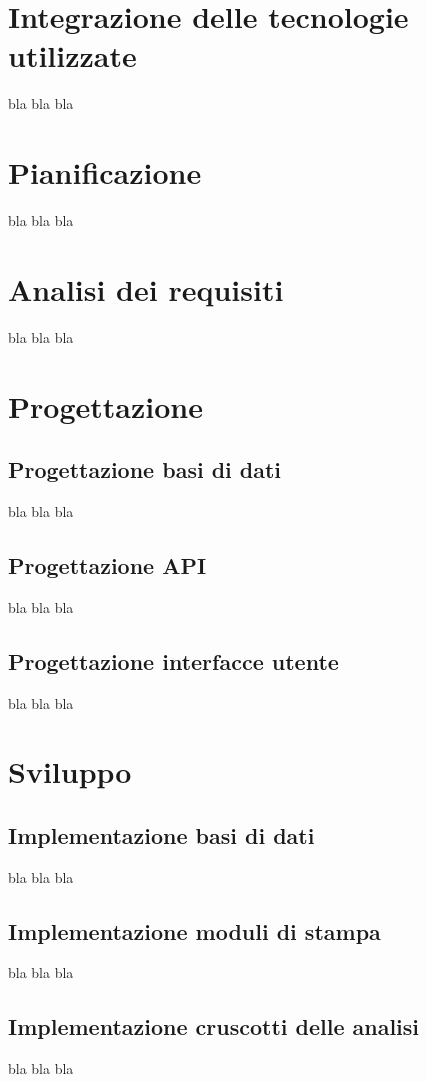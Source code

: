 \section{Integrazione delle tecnologie utilizzate}
bla bla bla

\section{Pianificazione}
bla bla bla

\section{Analisi dei requisiti}
bla bla bla

\section{Progettazione}
\subsection{Progettazione basi di dati}
bla bla bla
\subsection{Progettazione API}
bla bla bla
\subsection{Progettazione interfacce utente}
bla bla bla

\section{Sviluppo}
\subsection{Implementazione basi di dati}
bla bla bla
\subsection{Implementazione moduli di stampa}
bla bla bla
\subsection{Implementazione cruscotti delle analisi}
bla bla bla

